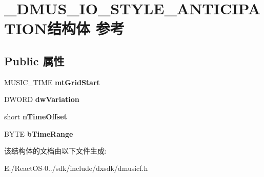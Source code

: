 \hypertarget{struct___d_m_u_s___i_o___s_t_y_l_e___a_n_t_i_c_i_p_a_t_i_o_n}{}\section{\+\_\+\+D\+M\+U\+S\+\_\+\+I\+O\+\_\+\+S\+T\+Y\+L\+E\+\_\+\+A\+N\+T\+I\+C\+I\+P\+A\+T\+I\+O\+N结构体 参考}
\label{struct___d_m_u_s___i_o___s_t_y_l_e___a_n_t_i_c_i_p_a_t_i_o_n}
\subsection*{Public 属性}
\begin{DoxyCompactItemize}
\item 
\mbox{\label{struct___d_m_u_s___i_o___s_t_y_l_e___a_n_t_i_c_i_p_a_t_i_o_n_af3ae9e144773d2611b0ed934c98fe120}} 
M\+U\+S\+I\+C\+\_\+\+T\+I\+ME {\bfseries mt\+Grid\+Start}
\item 
\mbox{\label{struct___d_m_u_s___i_o___s_t_y_l_e___a_n_t_i_c_i_p_a_t_i_o_n_afb2d37e6e0afd2a4f2cd8ddec6b9172a}} 
D\+W\+O\+RD {\bfseries dw\+Variation}
\item 
\mbox{\label{struct___d_m_u_s___i_o___s_t_y_l_e___a_n_t_i_c_i_p_a_t_i_o_n_ab8c3cc62199a07dcf2226d0fcdcb8674}} 
short {\bfseries n\+Time\+Offset}
\item 
\mbox{\label{struct___d_m_u_s___i_o___s_t_y_l_e___a_n_t_i_c_i_p_a_t_i_o_n_adb9de0e3ffa113a88941ee2fac2989ae}} 
B\+Y\+TE {\bfseries b\+Time\+Range}
\end{DoxyCompactItemize}


该结构体的文档由以下文件生成\+:\begin{DoxyCompactItemize}
\item 
E\+:/\+React\+O\+S-\/0../sdk/include/dxsdk/dmusicf.\+h\end{DoxyCompactItemize}
